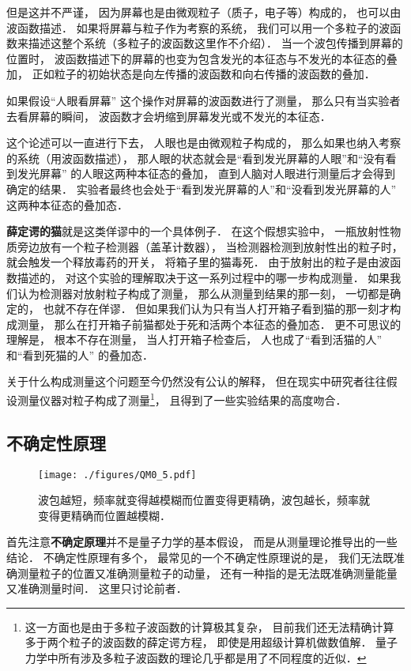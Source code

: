 但是这并不严谨， 因为屏幕也是由微观粒子（质子，电子等）构成的， 也可以由波函数描述． 如果将屏幕与粒子作为考察的系统， 我们可以用一个多粒子的波函数来描述这整个系统（多粒子的波函数这里作不介绍）． 当一个波包传播到屏幕的位置时， 波函数描述下的屏幕的也变为包含发光的本征态与不发光的本征态的叠加， 正如粒子的初始状态是向左传播的波函数和向右传播的波函数的叠加． 

如果假设“人眼看屏幕” 这个操作对屏幕的波函数进行了测量， 那么只有当实验者去看屏幕的瞬间， 波函数才会坍缩到屏幕发光或不发光的本征态．

这个论述可以一直进行下去， 人眼也是由微观粒子构成的， 那么如果也纳入考察的系统（用波函数描述）， 那人眼的状态就会是“看到发光屏幕的人眼”和“没有看到发光屏幕” 的人眼这两种本征态的叠加， 直到人脑对人眼进行测量后才会得到确定的结果． 实验者最终也会处于“看到发光屏幕的人”和“没看到发光屏幕的人” 这两种本征态的叠加态．

\textbf{薛定谔的猫}就是这类佯谬中的一个具体例子． 在这个假想实验中， 一瓶放射性物质旁边放有一个粒子检测器（盖革计数器）， 当检测器检测到放射性出的粒子时， 就会触发一个释放毒药的开关， 将箱子里的猫毒死． 由于放射出的粒子是由波函数描述的， 对这个实验的理解取决于这一系列过程中的哪一步构成测量． 如果我们认为检测器对放射粒子构成了测量， 那么从测量到结果的那一刻， 一切都是确定的， 也就不存在佯谬． 但如果我们认为只有当人打开箱子看到猫的那一刻才构成测量， 那么在打开箱子前猫都处于死和活两个本征态的叠加态． 更不可思议的理解是， 根本不存在测量， 当人打开箱子检查后， 人也成了“看到活猫的人” 和“看到死猫的人” 的叠加态．

关于什么构成测量这个问题至今仍然没有公认的解释， 但在现实中研究者往往假设测量仪器对粒子构成了测量\footnote{这一方面也是由于多粒子波函数的计算极其复杂， 目前我们还无法精确计算多于两个粒子的波函数的薛定谔方程， 即使是用超级计算机做数值解． 量子力学中所有涉及多粒子波函数的理论几乎都是用了不同程度的近似．}， 且得到了一些实验结果的高度吻合．

\subsection{不确定性原理}

\begin{figure}[ht]
\centering
\texttt{[image: ./figures/QM0\_5.pdf]}
\caption{波包越短，频率就变得越模糊而位置变得更精确，波包越长，频率就变得更精确而位置越模糊．} \label{QM0_fig5}
\end{figure}

首先注意\textbf{不确定原理}并不是量子力学的基本假设， 而是从测量理论推导出的一些结论． 不确定性原理有多个， 最常见的一个不确定性原理说的是， 我们无法既准确测量粒子的位置又准确测量粒子的动量， 还有一种指的是无法既准确测量能量又准确测量时间． 这里只讨论前者．

